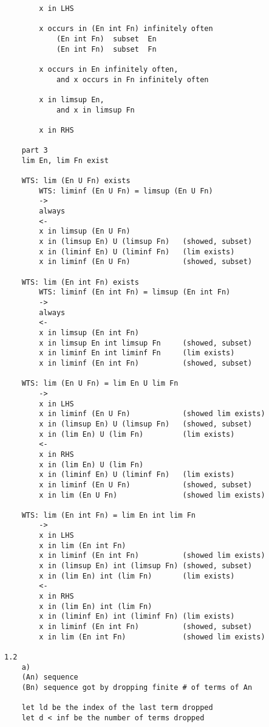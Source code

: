 \documentclass{article}
\begin{document}
\begin{flushleft}
\begin{verbatim}
        x in LHS 

        x occurs in (En int Fn) infinitely often 
            (En int Fn)  subset  En 
            (En int Fn)  subset  Fn

        x occurs in En infinitely often, 
            and x occurs in Fn infinitely often 

        x in limsup En,
            and x in limsup Fn 

        x in RHS 
        
    part 3
    lim En, lim Fn exist 

    WTS: lim (En U Fn) exists 
        WTS: liminf (En U Fn) = limsup (En U Fn)
        ->
        always 
        <- 
        x in limsup (En U Fn)
        x in (limsup En) U (limsup Fn)   (showed, subset)
        x in (liminf En) U (liminf Fn)   (lim exists)
        x in liminf (En U Fn)            (showed, subset)

    WTS: lim (En int Fn) exists 
        WTS: liminf (En int Fn) = limsup (En int Fn)
        ->
        always 
        <-
        x in limsup (En int Fn)
        x in limsup En int limsup Fn     (showed, subset)
        x in liminf En int liminf Fn     (lim exists)
        x in liminf (En int Fn)          (showed, subset)
            
    WTS: lim (En U Fn) = lim En U lim Fn 
        ->
        x in LHS 
        x in liminf (En U Fn)            (showed lim exists)
        x in (limsup En) U (limsup Fn)   (showed, subset)
        x in (lim En) U (lim Fn)         (lim exists)
        <- 
        x in RHS 
        x in (lim En) U (lim Fn)
        x in (liminf En) U (liminf Fn)   (lim exists)
        x in liminf (En U Fn)            (showed, subset)
        x in lim (En U Fn)               (showed lim exists)

    WTS: lim (En int Fn) = lim En int lim Fn
        ->
        x in LHS 
        x in lim (En int Fn) 
        x in liminf (En int Fn)          (showed lim exists)
        x in (limsup En) int (limsup Fn) (showed, subset)
        x in (lim En) int (lim Fn)       (lim exists)
        <-
        x in RHS 
        x in (lim En) int (lim Fn) 
        x in (liminf En) int (liminf Fn) (lim exists)
        x in liminf (En int Fn)          (showed, subset)
        x in lim (En int Fn)             (showed lim exists)

1.2
    a)
    (An) sequence
    (Bn) sequence got by dropping finite # of terms of An 
    
    let ld be the index of the last term dropped
    let d < inf be the number of terms dropped


\end{verbatim}
\end{flushleft}
\end{document}
